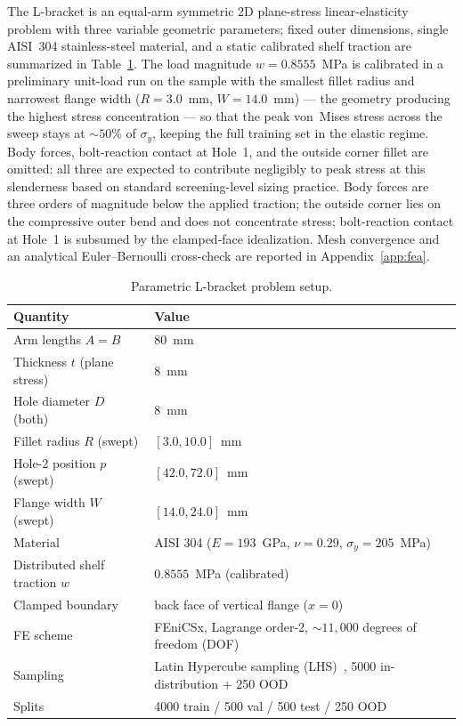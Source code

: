 \documentclass{article}
\begin{document}
The L-bracket is an equal-arm symmetric 2D plane-stress linear-elasticity
problem with three variable geometric parameters; fixed outer dimensions,
single AISI~304 stainless-steel material, and a static calibrated shelf
traction are summarized in Table~\ref{tab:setup}. The load magnitude
$w = 0.8555$~MPa is calibrated in a preliminary unit-load run on the
sample with the smallest fillet radius and narrowest flange width
($R = 3.0$~mm, $W = 14.0$~mm) --- the geometry producing the highest
stress concentration --- so that the peak von~Mises stress across the
sweep stays at $\sim 50\%$ of $\sigma_y$, keeping the full training set
in the elastic regime. Body forces, bolt-reaction contact at Hole~1, and the outside corner
fillet are omitted: all three are expected to contribute negligibly to
peak stress at this slenderness based on standard screening-level
sizing practice. Body forces are three orders of magnitude below the
applied traction; the outside corner lies on the compressive outer
bend and does not concentrate stress; bolt-reaction contact at Hole~1
is subsumed by the clamped-face idealization. Mesh convergence and an
analytical Euler--Bernoulli cross-check are reported in
Appendix~\ref{app:fea}.

\begin{table}[t]
  \centering
  \caption{Parametric L-bracket problem setup.}
  \label{tab:setup}
  \begin{tabular}{ll}
    \toprule
    Quantity & Value \\
    \midrule
    Arm lengths $A = B$ & $80$~mm \\
    Thickness $t$ (plane stress) & $8$~mm \\
    Hole diameter $D$ (both) & $8$~mm \\
    Fillet radius $R$ (swept) & $[3.0, 10.0]$~mm \\
    Hole-2 position $p$ (swept) & $[42.0, 72.0]$~mm \\
    Flange width $W$ (swept) & $[14.0, 24.0]$~mm \\
    Material & AISI 304 ($E = 193$~GPa, $\nu = 0.29$, $\sigma_y = 205$~MPa) \\
    Distributed shelf traction $w$ & $0.8555$~MPa (calibrated) \\
    Clamped boundary & back face of vertical flange ($x = 0$) \\
    FE scheme & FEniCSx, Lagrange order-2, $\sim 11{,}000$ degrees of freedom (DOF) \\
    Sampling & Latin Hypercube sampling (LHS)~\citep{mckay1979lhs}, 5000 in-distribution + 250 OOD \\
    Splits & 4000 train / 500 val / 500 test / 250 OOD \\
    \bottomrule
  \end{tabular}
\end{table}
\end{document}
